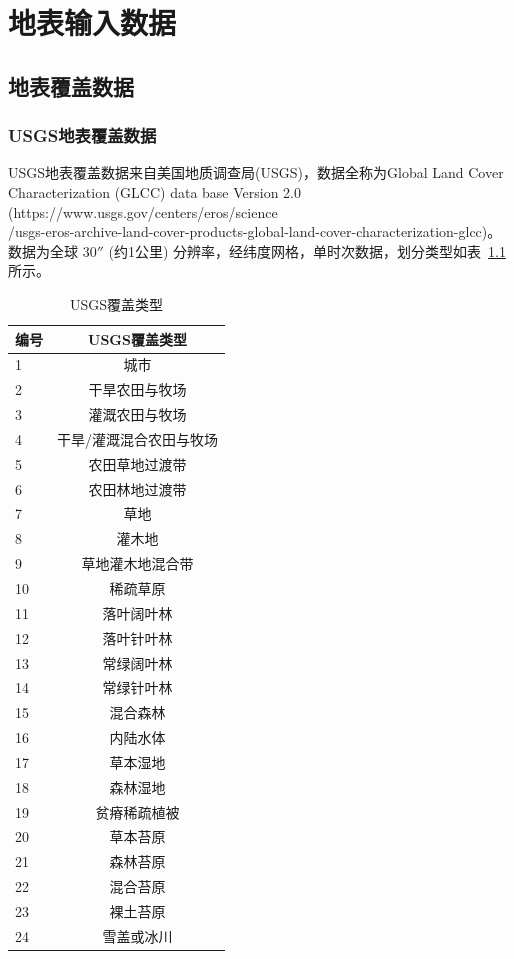 \chapter{地表输入数据}\label{地表输入数据}

\section{地表覆盖数据}\label{地表覆盖数据}
\subsection{USGS地表覆盖数据}\label{USGS地表覆盖数据}
USGS地表覆盖数据来自美国地质调查局(USGS)，数据全称为Global Land Cover Characterization (GLCC) data base Version 2.0 
(https://www.usgs.gov/centers/eros/science\\/usgs-eros-archive-land-cover-products-global-land-cover-characterization-glcc)。
数据为全球 $30''$ (约1公里) 分辨率，经纬度网格，单时次数据，划分类型如表~\ref{tab:USGS覆盖类型} 所示。
\begin{table}[]
\centering
\caption{USGS覆盖类型}
\label{tab:USGS覆盖类型}
\begin{tabular}{@{}lc@{}}
\toprule
编号 & USGS覆盖类型     \\ \midrule
1  & 城市           \\
2  & 干旱农田与牧场      \\
3  & 灌溉农田与牧场      \\
4  & 干旱/灌溉混合农田与牧场 \\
5  & 农田草地过渡带      \\
6  & 农田林地过渡带      \\
7  & 草地           \\
8  & 灌木地          \\
9  & 草地灌木地混合带     \\
10 & 稀疏草原         \\
11 & 落叶阔叶林        \\
12 & 落叶针叶林        \\
13 & 常绿阔叶林        \\
14 & 常绿针叶林        \\
15 & 混合森林         \\
16 & 内陆水体         \\
17 & 草本湿地         \\
18 & 森林湿地         \\
19 & 贫瘠稀疏植被       \\
20 & 草本苔原         \\
21 & 森林苔原         \\
22 & 混合苔原         \\
23 & 裸土苔原         \\
24 & 雪盖或冰川        \\ \bottomrule
\end{tabular}
\end{table}


